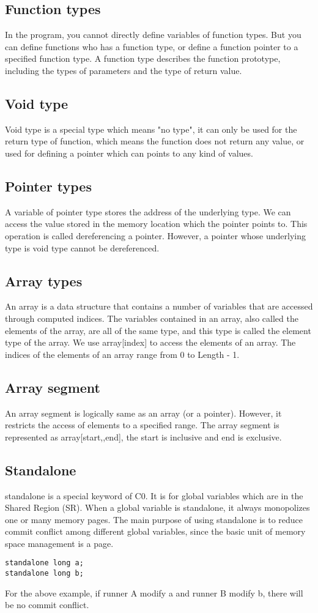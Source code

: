 \documentclass[a4paper]{article}
\begin{document}
\subsection{Function types}
In the program, you cannot directly define variables of function types. But you can define functions who has a function type, or define a function pointer to a specified function type.
A function type describes the function prototype, including the types of parameters and the type of return value.

\subsection{Void type}
Void type is a special type which means "no type", it can only be used for the return type of function, which means the function does not return any value, or used for defining a pointer which can points to any kind of values.

\subsection{Pointer types}
A variable of pointer type stores the address of the underlying type. We can access the value stored in the memory location which the pointer points to. This operation is called dereferencing a pointer. However, a pointer whose underlying type is void type cannot be dereferenced. 

\subsection{Array types}
An array is a data structure that contains a number of variables that are accessed through computed indices. The variables contained in an array, also called the elements of the array, are all of the same type, and this type is called the element type of the array. We use array[index] to access the elements of an array. The indices of the elements of an array range from 0 to Length - 1. 

\subsection{Array segment}
An array segment is logically same as an array (or a pointer). However, it restricts the access of elements to a specified range. The array segment is represented as array[start,,end], the start is inclusive and end is exclusive.

\subsection{Standalone}
standalone is a special keyword of C0. It is for global variables which are in the Shared Region (SR). When a global variable is standalone, it always monopolizes one or many memory pages. The main purpose of using standalone is to reduce commit conflict among different global variables, since the basic unit of memory space management is a page.

\begin{verbatim}
standalone long a;
standalone long b;
\end{verbatim}
For the above example, if runner A modify a and runner B modify b, there will be no commit conflict.
\end{document}
